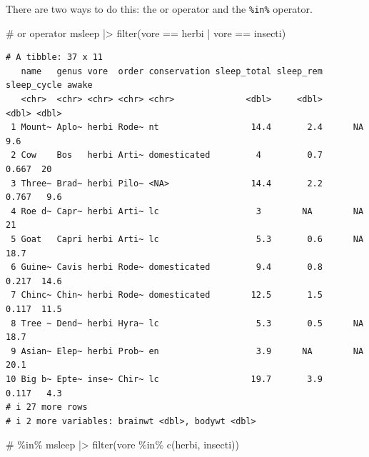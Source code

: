 \documentclass[
  letterpaper,
  DIV=11,
  numbers=noendperiod]{scrreprt}
\newenvironment{Shaded}{\begin{snugshade}}{\end{snugshade}}
\newcommand{\CommentTok}[1]{\textcolor[rgb]{0.37,0.37,0.37}{#1}}
\newcommand{\FunctionTok}[1]{\textcolor[rgb]{0.28,0.35,0.67}{#1}}
\newcommand{\NormalTok}[1]{\textcolor[rgb]{0.00,0.23,0.31}{#1}}
\newcommand{\SpecialCharTok}[1]{\textcolor[rgb]{0.37,0.37,0.37}{#1}}
\newcommand{\StringTok}[1]{\textcolor[rgb]{0.13,0.47,0.30}{#1}}
\begin{document}
\begin{tcolorbox}[enhanced jigsaw, colbacktitle=quarto-callout-tip-color!10!white, opacitybacktitle=0.6, breakable, left=2mm, leftrule=.75mm, toprule=.15mm, toptitle=1mm, bottomtitle=1mm, colframe=quarto-callout-tip-color-frame, opacityback=0, coltitle=black, arc=.35mm, titlerule=0mm, colback=white, bottomrule=.15mm, title=\textcolor{quarto-callout-tip-color}{\faLightbulb}\hspace{0.5em}{Answer}, rightrule=.15mm]

There are two ways to do this: the or \texttt{\textbar{}} operator and
the \texttt{\%in\%} operator.

\begin{Shaded}
\begin{Highlighting}[]
\CommentTok{\# \textquotesingle{}or\textquotesingle{} operator}
\NormalTok{msleep }\SpecialCharTok{|\textgreater{}}
  \FunctionTok{filter}\NormalTok{(vore }\SpecialCharTok{==} \StringTok{\textquotesingle{}herbi\textquotesingle{}} \SpecialCharTok{|}\NormalTok{ vore }\SpecialCharTok{==} \StringTok{\textquotesingle{}insecti\textquotesingle{}}\NormalTok{)}
\end{Highlighting}
\end{Shaded}

\begin{verbatim}
# A tibble: 37 x 11
   name   genus vore  order conservation sleep_total sleep_rem sleep_cycle awake
   <chr>  <chr> <chr> <chr> <chr>              <dbl>     <dbl>       <dbl> <dbl>
 1 Mount~ Aplo~ herbi Rode~ nt                  14.4       2.4      NA       9.6
 2 Cow    Bos   herbi Arti~ domesticated         4         0.7       0.667  20  
 3 Three~ Brad~ herbi Pilo~ <NA>                14.4       2.2       0.767   9.6
 4 Roe d~ Capr~ herbi Arti~ lc                   3        NA        NA      21  
 5 Goat   Capri herbi Arti~ lc                   5.3       0.6      NA      18.7
 6 Guine~ Cavis herbi Rode~ domesticated         9.4       0.8       0.217  14.6
 7 Chinc~ Chin~ herbi Rode~ domesticated        12.5       1.5       0.117  11.5
 8 Tree ~ Dend~ herbi Hyra~ lc                   5.3       0.5      NA      18.7
 9 Asian~ Elep~ herbi Prob~ en                   3.9      NA        NA      20.1
10 Big b~ Epte~ inse~ Chir~ lc                  19.7       3.9       0.117   4.3
# i 27 more rows
# i 2 more variables: brainwt <dbl>, bodywt <dbl>
\end{verbatim}

\begin{Shaded}
\begin{Highlighting}[]
\CommentTok{\# \%in\%}
\NormalTok{msleep }\SpecialCharTok{|\textgreater{}}
  \FunctionTok{filter}\NormalTok{(vore }\SpecialCharTok{\%in\%} \FunctionTok{c}\NormalTok{(}\StringTok{\textquotesingle{}herbi\textquotesingle{}}\NormalTok{, }\StringTok{\textquotesingle{}insecti\textquotesingle{}}\NormalTok{))}
\end{Highlighting}
\end{Shaded}


\end{tcolorbox}
\end{document}
